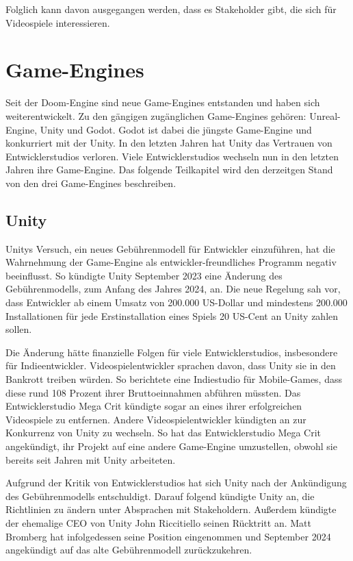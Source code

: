 Folglich kann davon ausgegangen werden, dass es Stakeholder gibt, die sich f\"{u}r Videospiele interessieren.



\section{Game-Engines}
\label{chap:sota game-engines}

Seit der Doom-Engine sind neue Game-Engines entstanden und haben sich weiterentwickelt. Zu den g\"{a}ngigen zug\"{a}nglichen Game-Engines geh\"{o}ren: Unreal-Engine, Unity und Godot. Godot ist dabei die j\"{u}ngste Game-Engine und konkurriert mit der Unity. In den letzten Jahren hat Unity das Vertrauen von Entwicklerstudios verloren. Viele Entwicklerstudios wechseln nun in den letzten Jahren ihre Game-Engine. Das folgende Teilkapitel wird den derzeitgen Stand von den drei Game-Engines beschreiben. 

\subsection{Unity}
\label{chap:sota unity}

Unitys Versuch, ein neues Geb\"{u}hrenmodell f\"{u}r Entwickler einzuf\"{u}hren, hat die Wahrnehmung der Game-Engine als entwickler-freundliches Programm negativ beeinflusst. So k\"{u}ndigte Unity September 2023 eine \"{A}nderung des Geb\"{u}hrenmodells, zum Anfang des Jahres 2024, an. Die neue Regelung sah vor, dass Entwickler ab einem Umsatz von 200.000 US-Dollar und mindestens 200.000 Installationen f\"{u}r jede Erstinstallation eines Spiels 20 US-Cent an Unity zahlen sollen. \autocite{golem1}

Die \"{A}nderung h\"{a}tte finanzielle Folgen f\"{u}r viele Entwicklerstudios, insbesondere f\"{u}r Indieentwickler. Videospielentwickler sprachen davon, dass Unity sie in den Bankrott treiben w\"{u}rden. So berichtete eine Indiestudio f\"{u}r Mobile-Games, dass diese rund 108 Prozent ihrer Bruttoeinnahmen abf\"{u}hren m\"{u}ssten. Das Entwicklerstudio Mega Crit k\"{u}ndigte sogar an eines ihrer erfolgreichen Videospiele zu entfernen. Andere Videospielentwickler k\"{u}ndigten an zur Konkurrenz von Unity zu wechseln. So hat das Entwicklerstudio Mega Crit angek\"{u}ndigt, ihr Projekt auf eine andere Game-Engine umzustellen, obwohl sie bereits seit Jahren mit Unity arbeiteten. \autocite{golem1} 

Aufgrund der Kritik von Entwicklerstudios hat sich Unity nach der Ank\"{u}ndigung des Geb\"{u}hrenmodells entschuldigt. Darauf folgend k\"{u}ndigte Unity an, die Richtlinien zu \"{a}ndern unter Absprachen mit Stakeholdern.\autocite{golem2} Au\ss{}erdem k\"{u}ndigte der ehemalige CEO von Unity John Riccitiello seinen R\"{u}cktritt an.\autocite{golem5} Matt Bromberg hat infolgedessen seine Position eingenommen und September 2024 angek\"{u}ndigt auf das alte Geb\"{u}hrenmodell zur\"{u}ckzukehren. \autocite{unity1}

